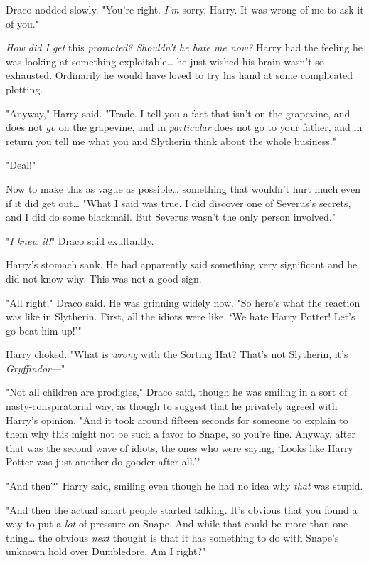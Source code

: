 Draco nodded slowly. "You're right. \emph{I'm} sorry, Harry. It was wrong of me 
to ask it of you."

\emph{How did I get} this \emph{promoted? Shouldn't he hate me now?} Harry had 
the feeling he was looking at something exploitable{\ldots} he just wished his 
brain wasn't so exhausted. Ordinarily he would have loved to try his hand at 
some complicated plotting.

"Anyway," Harry said. "Trade. I tell you a fact that isn't on the grapevine, 
and does not \emph{go} on the grapevine, and in \emph{particular} does not go 
to your father, and in return you tell me what you and Slytherin think about 
the whole business."

"Deal!"

Now to make this as vague as possible{\ldots} something that wouldn't hurt much 
even if it did get out{\ldots} "What I said was true. I did discover one of 
Severus's secrets, and I did do some blackmail. But Severus wasn't the only 
person involved."

"\emph{I knew it!}" Draco said exultantly.

Harry's stomach sank. He had apparently said something very significant and he 
did not know why. This was not a good sign.

"All right," Draco said. He was grinning widely now. "So here's what the 
reaction was like in Slytherin. First, all the idiots were like, `We hate Harry 
Potter! Let's go beat him up!'"

Harry choked. "What is \emph{wrong} with the Sorting Hat? That's not Slytherin, 
it's \emph{Gryffindor}---"

"Not all children are prodigies," Draco said, though he was smiling in a sort 
of nasty-conspiratorial way, as though to suggest that he privately agreed with 
Harry's opinion. "And it took around fifteen seconds for someone to explain to 
them why this might not be such a favor to Snape, so you're fine. Anyway, after 
that was the second wave of idiots, the ones who were saying, `Looks like Harry 
Potter was just another do-gooder after all.'"

"And then?" Harry said, smiling even though he had no idea why \emph{that} was 
stupid.

"And then the actual smart people started talking. It's obvious that you found 
a way to put a \emph{lot} of pressure on Snape. And while that could be more 
than one thing{\ldots} the obvious \emph{next} thought is that it has something 
to do with Snape's unknown hold over Dumbledore. Am I right?"


